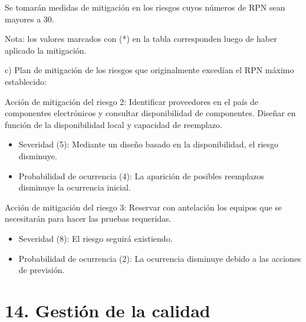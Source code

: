 \documentclass[
11pt, %
codirector, %
]{charter}
\begin{document}
Se tomarán medidas de mitigación en los riesgos cuyos números de RPN sean mayores a 30.

Nota: los valores marcados con (*) en la tabla corresponden luego de haber aplicado la mitigación.

c) Plan de mitigación de los riesgos que originalmente excedían el RPN máximo establecido:

Acción de mitigación del riesgo 2:	Identificar proveedores en el país de componentes electrónicos y consultar disponibilidad de componentes. Diseñar en función de la disponibilidad local y capacidad de reemplazo.

\begin{itemize}
	\item Severidad (5): Mediante un diseño basado en la disponibilidad, el riesgo disminuye.
	\item Probabilidad de ocurrencia (4): La aparición de posibles reemplazos disminuye la ocurrencia inicial.
\end{itemize}

Acción de mitigación del riesgo 3:	Reservar con antelación los equipos que se necesitarán para hacer
las pruebas requeridas.
\begin{itemize}
	\item Severidad (8): El riesgo seguirá existiendo.
	\item Probabilidad de ocurrencia (2): La ocurrencia disminuye debido a las acciones de previsión.
\end{itemize}


\section{14. Gestión de la calidad}
\label{sec:calidad}
\end{document}
